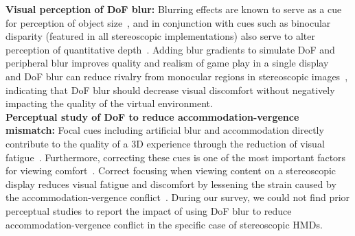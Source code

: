 \noindent \textbf{Visual perception of DoF blur: }
Blurring effects are known to serve as a cue for perception of object size~\cite{held10}, and in conjunction with cues such as binocular disparity (featured in all stereoscopic implementations) also serve to alter perception of quantitative depth~\cite{mather96}. Adding blur gradients to simulate DoF and peripheral blur improves quality and realism of game play in a single display~\cite{hillaire08} and DoF blur can reduce rivalry from monocular regions in stereoscopic images~\cite{hoffman10}, indicating that DoF blur should decrease visual discomfort without negatively impacting the quality of the virtual environment.  \\

\textbf{Perceptual study of DoF to reduce accommodation-vergence mismatch: }
Focal cues including artificial blur and accommodation directly contribute to the quality of a 3D experience through the reduction of visual fatigue~\cite{shiwa96}. Furthermore, correcting these cues is one of the most important factors for viewing comfort~\cite{kooi04}. Correct focusing when viewing content on a stereoscopic display reduces visual fatigue and discomfort by lessening the strain caused by the accommodation-vergence conflict~\cite{hoffman08}. %
During our survey, we could not find prior perceptual studies to report the impact of using DoF blur to reduce accommodation-vergence conflict in the specific case of stereoscopic HMDs.\\



